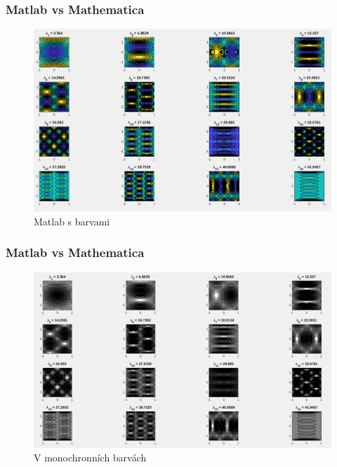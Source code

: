 \documentclass{beamer}
\begin{document}
\begin{frame}
  \frametitle{Matlab vs Mathematica}
  \begin{figure}[ht]
    \centering
    \includegraphics{barevne.png}
    \caption{\label{fig:label} Matlab s barvami}
  \end{figure}

\end{frame} 

\begin{frame}
  \frametitle{Matlab vs Mathematica}
  \begin{figure}
    \centering
    \includegraphics{sede1.png}
    \caption{V monochronních barvách}
  \end{figure}
\end{frame}
\end{document}
